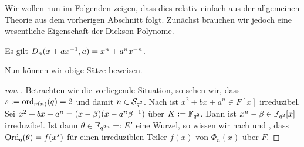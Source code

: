 Wir wollen nun im Folgenden zeigen, dass dies relativ einfach aus der
allgemeinen Theorie aus dem vorherigen Abschnitt folgt.
Zunächst brauchen wir jedoch eine wesentliche Eigenschaft der Dickson-Polynome.

\begin{lemma}[{??}]
  \label{lemma:dickson:dickson_polynome_potenz}
  Es gilt $D_n(x+a x\inv,a) = x^n + a^n x^{-n}$.
\end{lemma}

Nun können wir obige Sätze beweisen.

\begin{proof}[von ]
  Betrachten wir die vorliegende Situation, so sehen wir, dass
  $s := \ord_{\nu(n)}(q) = 2$ und damit $n \in \S_{q^2}$.
  Nach \thref{} ist $x^2 +bx+a^n \in F[x]$ irreduzibel. Sei 
  $x^2+bx+a^n = (x -\beta)(x -a^n\beta\inv)$ über $K := \F_{q^2}$.
  Dann ist $x^n-\beta \in \F_{q^2}[x]$ irreduzibel.
  Ist dann $\theta \in \F_{q^{2n}} =: E'$ eine Wurzel, so wissen wir nach
   und , dass
  $\Ord_q(\theta) = f(x^s)$ für einen irreduziblen Teiler $f(x)$ von
  $\Phi_n(x)$ über $F$. 
  

\end{proof}
